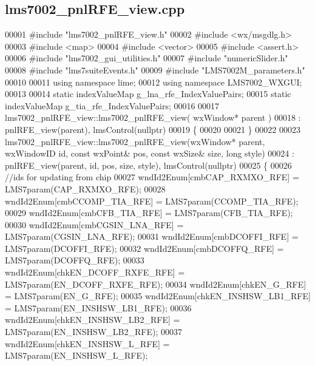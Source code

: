 \subsection{lms7002\+\_\+pnl\+R\+F\+E\+\_\+view.\+cpp}
\label{lms7002__pnlRFE__view_8cpp_source}

\begin{DoxyCode}
00001 \textcolor{preprocessor}{#include "lms7002_pnlRFE_view.h"}
00002 \textcolor{preprocessor}{#include <wx/msgdlg.h>}
00003 \textcolor{preprocessor}{#include <map>}
00004 \textcolor{preprocessor}{#include <vector>}
00005 \textcolor{preprocessor}{#include <assert.h>}
00006 \textcolor{preprocessor}{#include "lms7002_gui_utilities.h"}
00007 \textcolor{preprocessor}{#include "numericSlider.h"}
00008 \textcolor{preprocessor}{#include "lms7suiteEvents.h"}
00009 \textcolor{preprocessor}{#include "LMS7002M_parameters.h"}
00010 
00011 \textcolor{keyword}{using namespace }lime;
00012 \textcolor{keyword}{using namespace }LMS7002_WXGUI;
00013 
00014 \textcolor{keyword}{static} indexValueMap g_lna_rfe_IndexValuePairs;
00015 \textcolor{keyword}{static} indexValueMap g_tia_rfe_IndexValuePairs;
00016 
00017 lms7002_pnlRFE_view::lms7002_pnlRFE_view( wxWindow* parent )
00018     : pnlRFE_view(parent), lmsControl(nullptr)
00019 \{
00020 
00021 \}
00022 
00023 lms7002_pnlRFE_view::lms7002_pnlRFE_view(wxWindow* parent, wxWindowID \textcolor{keywordtype}{id}, \textcolor{keyword}{const} wxPoint& pos, \textcolor{keyword}{const} wxSize&
       size, \textcolor{keywordtype}{long} style)
00024     : pnlRFE_view(parent, id, pos, size, style), lmsControl(nullptr)
00025 \{
00026     \textcolor{comment}{//ids for updating from chip}
00027     wndId2Enum[cmbCAP_RXMXO_RFE] = LMS7param(CAP_RXMXO_RFE);
00028     wndId2Enum[cmbCCOMP_TIA_RFE] = LMS7param(CCOMP_TIA_RFE);
00029     wndId2Enum[cmbCFB_TIA_RFE] = LMS7param(CFB_TIA_RFE);
00030     wndId2Enum[cmbCGSIN_LNA_RFE] = LMS7param(CGSIN_LNA_RFE);
00031     wndId2Enum[cmbDCOFFI_RFE] = LMS7param(DCOFFI_RFE);
00032     wndId2Enum[cmbDCOFFQ_RFE] = LMS7param(DCOFFQ_RFE);
00033     wndId2Enum[chkEN_DCOFF_RXFE_RFE] = LMS7param(EN_DCOFF_RXFE_RFE);
00034     wndId2Enum[chkEN_G_RFE] = LMS7param(EN_G_RFE);
00035     wndId2Enum[chkEN_INSHSW_LB1_RFE] = LMS7param(EN_INSHSW_LB1_RFE);
00036     wndId2Enum[chkEN_INSHSW_LB2_RFE] = LMS7param(EN_INSHSW_LB2_RFE);
00037     wndId2Enum[chkEN_INSHSW_L_RFE] = LMS7param(EN_INSHSW_L_RFE);

\end{DoxyCode}
